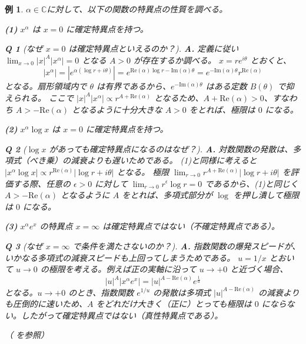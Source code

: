 \documentclass[paper=a4, fontsize=11pt]{jlreq} %
\theoremstyle{break}
\newtheorem{example}[theorem]{例}
\theoremstyle{qa}
\newtheorem*{Q}{Q}
\theoremstyle{remark} %
\begin{document}
\begin{example}\label{ex:regular_singular_points}
    $\alpha\in\mathbb{C}$に対して、以下の関数の特異点の性質を調べる。
    
    \textbf{(1)} $x^{\alpha}$ は $x=0$ に確定特異点を持つ。
    \begin{Q}[なぜ $x=0$ は確定特異点といえるのか？]
    \textbf{A.} 定義に従い $\lim_{x\to 0} |x|^A |x^\alpha| = 0$ となる $A>0$ が存在するか調べる。
    $x = r e^{i\theta}$ とおくと、
    \[
    |x^{\alpha}| = |e^{\alpha(\log r + i\theta)}| = e^{\text{Re}(\alpha)\log r - \text{Im}(\alpha)\theta} = e^{-\text{Im}(\alpha)\theta} r^{\text{Re}(\alpha)}
    \]
    となる。扇形領域内で $\theta$ は有界であるから、$e^{-\text{Im}(\alpha)\theta}$ はある定数 $B(\theta)$ で抑えられる。
    ここで $|x|^A |x^\alpha| \propto r^{A + \text{Re}(\alpha)}$ となるため、$A + \text{Re}(\alpha) > 0$、すなわち $A > -\text{Re}(\alpha)$ となるように十分大きな $A>0$ をとれば、極限は $0$ になる。
    \end{Q}

    \textbf{(2)} $x^{\alpha}\log x$ は $x=0$ に確定特異点を持つ。
    \begin{Q}[$\log x$ があっても確定特異点になるのはなぜ？]
    \textbf{A.} 対数関数の発散は、多項式（べき乗）の減衰よりも遅いためである。
    (1)と同様に考えると $|x^{\alpha}\log x| \propto r^{\text{Re}(\alpha)}|\log r + i\theta|$ となる。
    極限 $\lim_{r\to 0} r^{A + \text{Re}(\alpha)} |\log r + i\theta|$ を評価する際、任意の $\epsilon > 0$ に対して $\lim_{r\to 0} r^\epsilon \log r = 0$ であるから、(1)と同じく $A > -\text{Re}(\alpha)$ となるように $A$ をとれば、多項式部分が $\log$ を押し潰して極限は $0$ になる。
    \end{Q}

    \textbf{(3)} $x^{\alpha}e^{x}$ の特異点 $x=\infty$ は確定特異点ではない（不確定特異点である）。
    \begin{Q}[なぜ $x=\infty$ で条件を満たさないのか？]
    \textbf{A.} 指数関数の爆発スピードが、いかなる多項式の減衰スピードも上回ってしまうためである。
    $u = 1/x$ とおいて $u \to 0$ の極限を考える。例えば正の実軸に沿って $u \to +0$ と近づく場合、
    \[
    |u|^A |x^{\alpha}e^{x}| = |u|^{A - \text{Re}(\alpha)} e^{\frac{1}{u}}
    \]
    となる。$u \to +0$ のとき、指数関数 $e^{1/u}$ の発散は多項式 $|u|^{A-\text{Re}(\alpha)}$ の減衰よりも圧倒的に速いため、$A$ をどれだけ大きく（正に）とっても極限は $0$ にならない。したがって確定特異点ではない（真性特異点である）。
    \end{Q}
    
    （\cite[p.60 例2.2]{book:okamoto} を参照）
\end{example}
\end{document}
